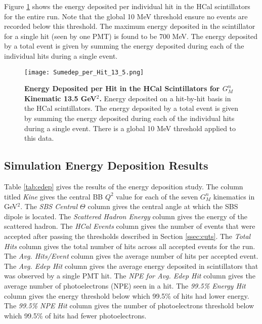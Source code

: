 \documentclass[10pt]{article}
\begin{document}
	Figure \ref{fig:sumedep} shows the energy deposited per individual hit in the HCal scintillators for the entire run. Note that the global 10 MeV threshold ensure no events are recorded below this threshold. The maximum energy deposited in the scintillator for a single hit (seen by one PMT) is found to be 700 MeV. The energy deposited by a total event is given by summing the energy deposited during each of the individual hits during a single event.\\
	
	\begin{figure}[!ht]
	\begin{center}
	\texttt{[image: Sumedep\_per\_Hit\_13\_5.png]}
	\end{center}
	\caption{
	{\bf{Energy Deposited per Hit in the HCal Scintillators for $G_M^n$ Kinematic 13.5 GeV$^2$.}} Energy deposited on a hit-by-hit basis in the HCal scintillators. The energy deposited by a total event is given by summing the energy deposited during each of the individual hits during a single event. There is a global 10 MeV threshold applied to this data.}
	\label{fig:sumedep}
	\end{figure}	
	
\subsection{Simulation Energy Deposition Results}

Table \ref{tab:edep} gives the results of the energy deposition study. The column titled \textit{Kine} gives the central BB $Q^2$ value for each of the seven $G_M^n$ kinematics in GeV$^2$. The \textit{SBS Central $\Theta$} column gives the central angle at which the SBS dipole is located. The \textit{Scattered Hadron Energy} column gives the energy of the scattered hadron. The \textit{HCal Events} column gives the number of events that were accepted after passing the thresholds described in Section \ref{ssec:cuts}. The \textit{Total Hits} column gives the total number of hits across all accepted events for the run. The \textit{Avg. Hits/Event} column gives the average number of hits per accepted event.\\

The \textit{Avg. Edep Hit} column gives the average energy deposited in scintillators that was observed by a single PMT hit. The \textit{NPE for Avg. Edep Hit} column gives the average number of photoelectrons (NPE) seen in a hit. The \textit{99.5\% Energy Hit} column gives the energy threshold below which 99.5\% of hits had lower energy. The \textit{99.5\% NPE Hit} column gives the number of photoelectrons threshold below which 99.5\% of hits had fewer photoelectrons.\\
\end{document}

